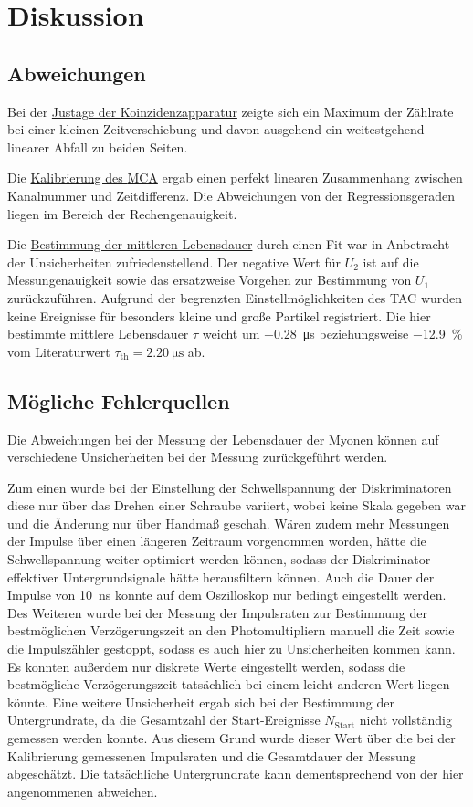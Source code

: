 \section{Diskussion}
\label{sec:diskussion}

\subsection{Abweichungen}
Bei der \hyperref[sec:auswertung:koinzidenz]{Justage der Koinzidenzapparatur} zeigte sich
ein Maximum der Zählrate bei einer kleinen Zeitverschiebung
und davon ausgehend ein weitestgehend linearer Abfall zu beiden Seiten.

Die \hyperref[sec:auswertung:mca]{Kalibrierung des \acs{MCA}} ergab einen perfekt linearen Zusammenhang zwischen Kanalnummer und Zeitdifferenz.
Die Abweichungen von der Regressionsgeraden liegen im Bereich der Rechengenauigkeit.

Die \hyperref[sec:auswertung:lebensdauer]{Bestimmung der mittleren Lebensdauer} durch einen Fit war in Anbetracht der Unsicherheiten zufriedenstellend.
Der negative Wert für $U_2$ ist auf die Messungenauigkeit sowie das ersatzweise Vorgehen zur Bestimmung von $U_1$ zurückzuführen.
Aufgrund der begrenzten Einstellmöglichkeiten des \ac{TAC} wurden keine Ereignisse für besonders kleine und große Partikel registriert.
Die hier bestimmte mittlere Lebensdauer $\tau$
weicht um \SI{-0.28}{\micro\second} beziehungsweise \SI{-12.9}{\percent} vom Literaturwert $\tau_\text{th} = \SI{2.20}{\micro\second}$ \cite{pdg} ab.


\subsection{Mögliche Fehlerquellen}

Die Abweichungen bei der Messung der Lebensdauer der Myonen können auf verschiedene Unsicherheiten bei der Messung zurückgeführt werden.

Zum einen wurde bei der Einstellung der Schwellspannung der Diskriminatoren diese nur über das Drehen einer Schraube variiert,
wobei keine Skala gegeben war und die Änderung nur über Handmaß geschah.
%
Wären zudem mehr Messungen der Impulse über einen längeren Zeitraum vorgenommen worden,
hätte die Schwellspannung weiter optimiert werden können,
sodass der Diskriminator effektiver Untergrundsignale hätte herausfiltern können.
%
Auch die Dauer der Impulse von \SI{10}{\nano\second} konnte auf dem Oszilloskop nur bedingt eingestellt werden.
%
Des Weiteren wurde bei der Messung der Impulsraten zur Bestimmung der bestmöglichen Verzögerungszeit an den Photomultipliern
manuell die Zeit sowie die Impulszähler gestoppt,
sodass es auch hier zu Unsicherheiten kommen kann.
%
Es konnten außerdem nur diskrete Werte eingestellt werden,
sodass die bestmögliche Verzögerungszeit tatsächlich bei einem leicht anderen Wert liegen könnte.
%
Eine weitere Unsicherheit ergab sich bei der Bestimmung der Untergrundrate,
da die Gesamtzahl der Start-Ereignisse $N_\text{Start}$ nicht vollständig gemessen werden konnte.
Aus diesem Grund wurde dieser Wert über die bei der Kalibrierung gemessenen Impulsraten und die Gesamtdauer der Messung abgeschätzt.
Die tatsächliche Untergrundrate kann dementsprechend von der hier angenommenen abweichen.
